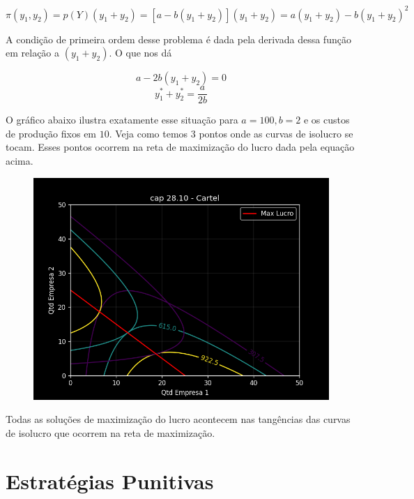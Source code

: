 \documentclass[a4paper,11pt,oneside]{book}
\theoremstyle{definition}
\theoremstyle{break}
\begin{document}
$$\pi(y_1,y_2) = p(Y)(y_1 + y_2) = [a - b(y_1 + y_2)](y_1 + y_2) = a(y_1 + y_2) - b(y_1 + y_2)^2$$

A condição de primeira ordem desse problema é dada pela derivada dessa função em relação a $(y_1 + y_2)$. O que nos dá

$$a - 2b(y_1 + y_2) = 0$$
$$y_1^* + y_2^* = \frac{a}{2b}$$

O gráfico abaixo ilustra exatamente esse situação para $a = 100, b = 2$ e os custos de produção fixos em $10$. Veja como temos 3 pontos onde as curvas de isolucro se tocam. Esses pontos ocorrem na reta de maximização do lucro dada pela equação acima.

\begin{figure}[H]
\centering
\includegraphics[scale=0.75]{cap28_10-cartel.png}
\end{figure}

Todas as soluções de maximização do lucro acontecem nas tangências das curvas de isolucro que ocorrem na reta de maximização.

\section{Estratégias Punitivas}
\end{document}

